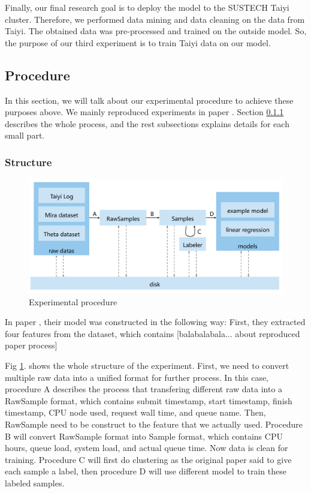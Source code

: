 \documentclass[conference,compsoc]{IEEEtran}
\begin{document}
Finally, our final research goal is to deploy the model to the SUSTECH Taiyi cluster. Therefore, we performed data mining and data cleaning on the data from Taiyi. The obtained data was pre-processed and trained on the outside model. So, the purpose of our third experiment is to train Taiyi data on our model.

\subsection{Procedure}
In this section, we will talk about our experimental procedure to achieve these purposes above. We mainly  reproduced experiments in paper \cite{pal2021integrated}.
Section \ref{structure} describes the whole process, and the rest subsections explains details for each small part.

\subsubsection{Structure}
\label{structure}
\begin{figure}[htbp]
	\centering
	\includegraphics[width=\linewidth,scale=1.00]{structure.png}
	\caption{Experimental procedure}
	\label{structure.png}
\end{figure}
In paper \cite{pal2021integrated}, their model was constructed in the following way: First, they extracted four features from the dataset, which contains [balabalabala... about reproduced paper process]

Fig \ref{structure.png}. shows the whole structure of the experiment. First, we need to convert multiple raw data into a unified format for further process. In this case, procedure A describes the process that transfering different raw data into a RawSample format, which contains submit timestamp, start timestamp, finish timestamp, CPU node used, request wall time, and queue name. Then, RawSample need to be construct to the feature that we actually used. Procedure B will convert RawSample format into Sample format, which contains CPU hours, queue load, system load, and actual queue time. Now data is clean for training. Procedure C will first do clustering as the original paper said to give each sample a label, then procedure D will use different model to train these labeled samples.
\end{document}
